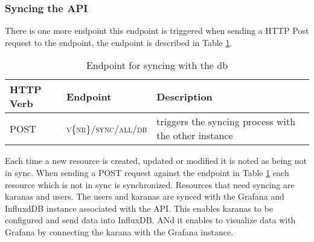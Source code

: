 \subsubsection{Syncing the API }\label{subsubsection:sync}
There is one more endpoint this endpoint is triggered when sending a HTTP Post request to the endpoint, the endpoint is described in Table \ref{table:syncing}.
\begin{table}
	\begin{tabular}{ p{2cm}| p{4cm} | p{5cm} }
		HTTP Verb & Endpoint & Description \\\hline\hline
		POST & \textsc{v\{nr\}/sync/all/db}  & triggers the syncing process with the other instance  \\	
	\end{tabular}
	\caption{Endpoint for syncing with the db}\label{table:syncing}
\end{table}
Each time a new resource is created, updated or modified it is noted as being not in sync. When sending a POST request against the endpoint in Table \ref{table:syncing} each resource which is not in sync is synchronized. Resources that need syncing are karanas and users. The users and karanas are synced with the Grafana and InfluxdDB instance associated with the API. This enables karanas to be configured and send data into InfluxDB. ANd it enables to visualize data with Grafana by connecting the karana with the Grafana instance.

